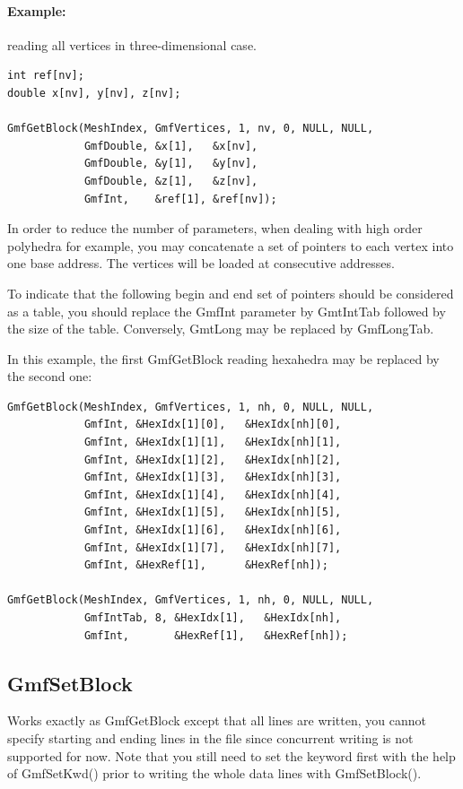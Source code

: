 \documentclass[a4paper,12pt]{article}
\begin{document}
\paragraph{Example:} reading all vertices in three-dimensional case.

\begin{tt}
\begin{verbatim}
int ref[nv];
double x[nv], y[nv], z[nv];

GmfGetBlock(MeshIndex, GmfVertices, 1, nv, 0, NULL, NULL,
            GmfDouble, &x[1],   &x[nv],
            GmfDouble, &y[1],   &y[nv],
            GmfDouble, &z[1],   &z[nv],
            GmfInt,    &ref[1], &ref[nv]);
\end{verbatim}
\end{tt}
\normalfont

In order to reduce the number of parameters, when dealing with high order polyhedra for example, you may concatenate a set of pointers to each vertex into one base address. The vertices will be loaded at consecutive addresses.

To indicate that the following begin and end set of pointers should be considered as a table, you should replace the GmfInt parameter by GmtIntTab followed by the size of the table. Conversely, GmtLong may be replaced by GmfLongTab.

In this example, the first GmfGetBlock reading hexahedra may be replaced by the second one:

\begin{tt}
\begin{verbatim}
GmfGetBlock(MeshIndex, GmfVertices, 1, nh, 0, NULL, NULL,
            GmfInt, &HexIdx[1][0],   &HexIdx[nh][0],
            GmfInt, &HexIdx[1][1],   &HexIdx[nh][1],
            GmfInt, &HexIdx[1][2],   &HexIdx[nh][2],
            GmfInt, &HexIdx[1][3],   &HexIdx[nh][3],
            GmfInt, &HexIdx[1][4],   &HexIdx[nh][4],
            GmfInt, &HexIdx[1][5],   &HexIdx[nh][5],
            GmfInt, &HexIdx[1][6],   &HexIdx[nh][6],
            GmfInt, &HexIdx[1][7],   &HexIdx[nh][7],
            GmfInt, &HexRef[1],      &HexRef[nh]);

GmfGetBlock(MeshIndex, GmfVertices, 1, nh, 0, NULL, NULL,
            GmfIntTab, 8, &HexIdx[1],   &HexIdx[nh],
            GmfInt,       &HexRef[1],   &HexRef[nh]);

\end{verbatim}
\end{tt}
\normalfont


\subsection{GmfSetBlock}
Works exactly as GmfGetBlock except that all lines are written, you cannot specify starting and ending lines in the file since concurrent writing is not supported for now. Note that you still need to set the keyword first with the help of GmfSetKwd() prior to writing the whole data lines with GmfSetBlock().
\end{document}
